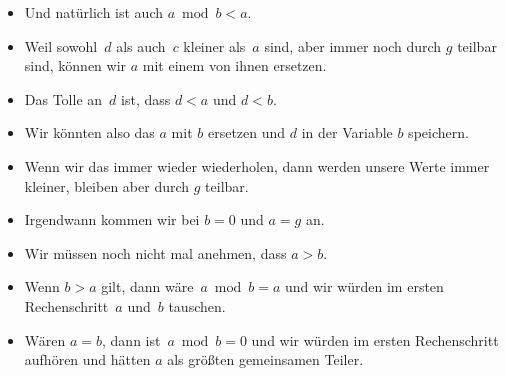 \documentclass[aspectratio=169,mathserif,notheorems]{beamer}%
\begin{document}
\begin{frame}[t]
\begin{itemize}
{}%
%
%
%
%
%
%
%
\item<18-> Und natürlich ist auch $a\bmod b<a$.%
%
\item<19-> Weil sowohl~$d$ als auch~$c$ kleiner als~$a$ sind, aber immer noch durch $g$ teilbar sind, können wir $a$ mit einem von ihnen ersetzen.%
%
\item<20-> Das Tolle an~$d$ ist, dass $d<a$ und $d<b$.%
%
\item<21-> Wir könnten also das  $a$ mit $b$ ersetzen und $d$ in der Variable $b$ speichern.%
%
\item<22-> Wenn wir das immer wieder wiederholen, dann werden unsere Werte immer kleiner, bleiben aber durch $g$ teilbar.%
%
\item<23-> Irgendwann kommen wir bei $b=0$ und $a=g$ an.%
%
\item<24-> Wir müssen noch nicht mal anehmen, dass $a>b$.%
%
\item<25-> Wenn $b>a$ gilt, dann wäre~$a \bmod b=a$ und wir würden im ersten Rechenschritt~$a$ und~$b$ tauschen.%
%
\item<26-> Wären $a=b$, dann ist~$a \bmod b=0$ und wir würden im ersten Rechenschritt aufhören und hätten $a$ als größten gemeinsamen Teiler.%
%
\end{itemize}%
%
%
\end{frame}%
%
\end{document}
